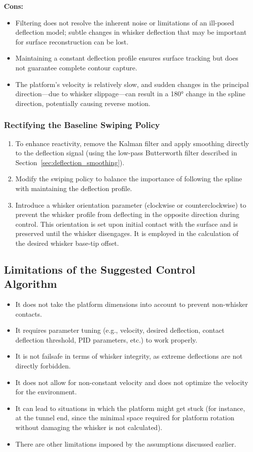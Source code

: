 \textbf{Cons:}
\begin{itemize}
    \item Filtering does not resolve the inherent noise or limitations of an ill-posed deflection model; subtle changes in whisker deflection that may be important for surface reconstruction can be lost.
    \item Maintaining a constant deflection profile ensures surface tracking but does not guarantee complete contour capture.
    \item The platform's velocity is relatively slow, and sudden changes in the principal direction—due to whisker slippage—can result in a 180° change in the spline direction, potentially causing reverse motion.
\end{itemize}

\subsubsection{Rectifying the Baseline Swiping Policy}
\begin{enumerate}
    \item To enhance reactivity, remove the Kalman filter and apply smoothing directly to the deflection signal (using the low-pass Butterworth filter described in Section~\ref{sec:deflection_smoothing}).
    \item Modify the swiping policy to balance the importance of following the spline with maintaining the deflection profile.
    \item Introduce a whisker orientation parameter (clockwise or counterclockwise) to prevent the whisker profile from deflecting in the opposite direction during control.
    This orientation is set upon initial contact with the surface and is preserved until the whisker disengages.
    It is employed in the calculation of the desired whisker base-tip offset.
\end{enumerate}

\subsection{Limitations of the Suggested Control Algorithm}
\begin{itemize}
    \item It does not take the platform dimensions into account to prevent non-whisker contacts.
    \item It requires parameter tuning (e.g., velocity, desired deflection, contact deflection threshold, PID parameters, etc.) to work properly.
    \item It is not failsafe in terms of whisker integrity, as extreme deflections are not directly forbidden.
    \item It does not allow for non-constant velocity and does not optimize the velocity for the environment.
    \item It can lead to situations in which the platform might get stuck (for instance, at the tunnel end, since the minimal space required for platform rotation without damaging the whisker is not calculated).
    \item There are other limitations imposed by the assumptions discussed earlier.
\end{itemize}
